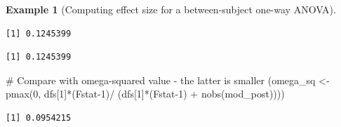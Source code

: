 \documentclass[
  11pt,
  letterpaper,
]{scrbook}
\newenvironment{Shaded}{\begin{snugshade}}{\end{snugshade}}
\newcommand{\AttributeTok}[1]{\textcolor[rgb]{0.40,0.45,0.13}{#1}}
\newcommand{\CommentTok}[1]{\textcolor[rgb]{0.37,0.37,0.37}{#1}}
\newcommand{\ConstantTok}[1]{\textcolor[rgb]{0.56,0.35,0.01}{#1}}
\newcommand{\DecValTok}[1]{\textcolor[rgb]{0.68,0.00,0.00}{#1}}
\newcommand{\FunctionTok}[1]{\textcolor[rgb]{0.28,0.35,0.67}{#1}}
\newcommand{\NormalTok}[1]{\textcolor[rgb]{0.00,0.23,0.31}{#1}}
\newcommand{\OtherTok}[1]{\textcolor[rgb]{0.00,0.23,0.31}{#1}}
\newcommand{\SpecialCharTok}[1]{\textcolor[rgb]{0.37,0.37,0.37}{#1}}
\theoremstyle{definition}
\newtheorem{example}{Example}[chapter]
\theoremstyle{definition}
\theoremstyle{remark}
\begin{document}
\begin{example}[Computing effect size for a between-subject one-way
ANOVA]
\begin{Shaded}
\end{Shaded}

\begin{verbatim}
[1] 0.1245399
\end{verbatim}

\begin{Shaded}
\end{Shaded}

\begin{verbatim}
[1] 0.1245399
\end{verbatim}

\begin{Shaded}
\begin{Highlighting}[]
\CommentTok{\# Compare with omega{-}squared value {-} the latter is smaller}
\NormalTok{(omega\_sq }\OtherTok{\textless{}{-}} \FunctionTok{pmax}\NormalTok{(}\DecValTok{0}\NormalTok{, dfs[}\DecValTok{1}\NormalTok{]}\SpecialCharTok{*}\NormalTok{(Fstat}\DecValTok{{-}1}\NormalTok{)}\SpecialCharTok{/}\NormalTok{ (dfs[}\DecValTok{1}\NormalTok{]}\SpecialCharTok{*}\NormalTok{(Fstat}\DecValTok{{-}1}\NormalTok{) }\SpecialCharTok{+} \FunctionTok{nobs}\NormalTok{(mod\_post))))}
\end{Highlighting}
\end{Shaded}

\begin{verbatim}
[1] 0.0954215
\end{verbatim}

\begin{Shaded}
\end{Shaded}


\end{example}
\end{document}
